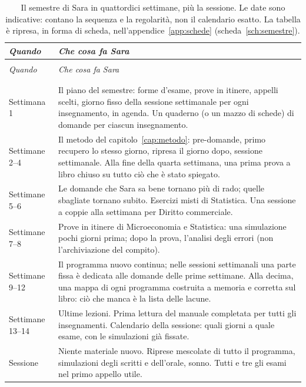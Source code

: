 \begingroup\small\captionsetup{position=below}
\setlength{\LTpre}{1.2\baselineskip}\setlength{\LTpost}{1.2\baselineskip}
\begin{longtable}{@{}>{\raggedright\arraybackslash}p{}>{\raggedright\arraybackslash}p{}@{}}
    \toprule
    \textit{Quando} & \textit{Che cosa fa Sara} \\
    \midrule
    \endfirsthead
    \multicolumn{2}{@{}l}{\small\emph{Tabella~\ref{tab:semestre} (continua)}} \\
    \toprule
    \textit{Quando} & \textit{Che cosa fa Sara} \\
    \midrule
    \endhead
    \midrule
    \multicolumn{2}{r@{}}{\small\emph{segue}} \\
    \endfoot
    \bottomrule
  \caption{Il semestre di Sara in quattordici settimane, più la
    sessione. Le date sono indicative: contano la sequenza e la
    regolarità, non il calendario esatto. La tabella è ripresa, in forma
    di scheda, nell'appendice~\ref{app:schede} (scheda~\ref{sch:semestre}).}
  \label{tab:semestre} \\
    \endlastfoot
    Settimana 1 & Il piano del semestre: forme d'esame, prove in itinere,
      appelli scelti, giorno fisso della sessione settimanale per ogni
      insegnamento, in agenda. Un quaderno (o un mazzo di schede) di
      domande per ciascun insegnamento. \\
    \addlinespace
    Settimane 2--4 & Il metodo del capitolo~\ref{cap:metodo}: pre-domande,
      primo recupero lo stesso giorno, ripresa il giorno dopo, sessione
      settimanale. Alla fine della quarta settimana, una prima prova a
      libro chiuso su tutto ciò che è stato spiegato. \\
    \addlinespace
    Settimane 5--6 & Le domande che Sara sa bene tornano più di rado;
      quelle sbagliate tornano subito. Esercizi misti di Statistica.
      Una sessione a coppie alla settimana per Diritto commerciale. \\
    \addlinespace
    Settimane 7--8 & Prove in itinere di Microeconomia e Statistica:
      una simulazione pochi giorni prima; dopo la prova, l'analisi
      degli errori (non l'archiviazione del compito). \\
    \addlinespace
    Settimane 9--12 & Il programma nuovo continua; nelle sessioni
      settimanali una parte fissa è dedicata alle domande delle prime
      settimane. Alla decima, una mappa di ogni programma costruita a
      memoria e corretta sul libro: ciò che manca è la lista delle
      lacune. \\
    \addlinespace
    Settimane 13--14 & Ultime lezioni. Prima lettura del manuale
      completata per tutti gli insegnamenti. Calendario della sessione:
      quali giorni a quale esame, con le simulazioni già fissate. \\*
    \addlinespace
    Sessione & Niente materiale nuovo. Riprese mescolate di tutto il
      programma, simulazioni degli scritti e dell'orale, sonno. Tutti e
      tre gli esami nel primo appello utile. \\
    \end{longtable}
\endgroup

